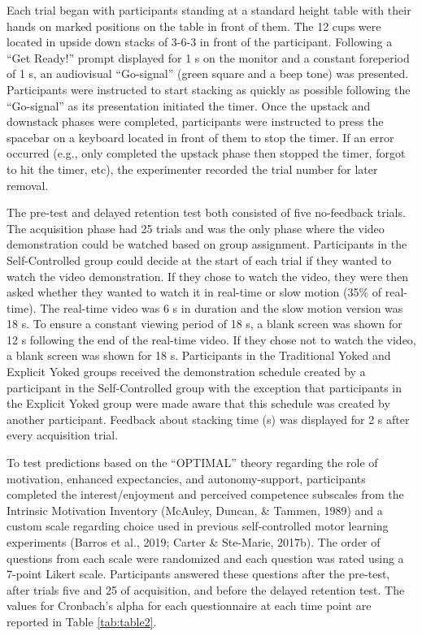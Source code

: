 \documentclass[
  english,
  doc, donotrepeattitle,floatsintext]{apa7}
\begin{document}
Each trial began with participants standing at a standard height table with their hands on marked positions on the table in front of them. The 12 cups were located in upside down stacks of 3-6-3 in front of the participant. Following a ``Get Ready!'' prompt displayed for 1 s on the monitor and a constant foreperiod of 1 s, an audiovisual ``Go-signal'' (green square and a beep tone) was presented. Participants were instructed to start stacking as quickly as possible following the ``Go-signal'' as its presentation initiated the timer. Once the upstack and downstack phases were completed, participants were instructed to press the spacebar on a keyboard located in front of them to stop the timer. If an error occurred (e.g., only completed the upstack phase then stopped the timer, forgot to hit the timer, etc), the experimenter recorded the trial number for later removal.

The pre-test and delayed retention test both consisted of five no-feedback trials. The acquisition phase had 25 trials and was the only phase where the video demonstration could be watched based on group assignment. Participants in the Self-Controlled group could decide at the start of each trial if they wanted to watch the video demonstration. If they chose to watch the video, they were then asked whether they wanted to watch it in real-time or slow motion (35\% of real-time). The real-time video was 6 s in duration and the slow motion version was 18 s. To ensure a constant viewing period of 18 s, a blank screen was shown for 12 s following the end of the real-time video. If they chose not to watch the video, a blank screen was shown for 18 s. Participants in the Traditional Yoked and Explicit Yoked groups received the demonstration schedule created by a participant in the Self-Controlled group with the exception that participants in the Explicit Yoked group were made aware that this schedule was created by another participant. Feedback about stacking time (s) was displayed for 2 s after every acquisition trial.

To test predictions based on the ``OPTIMAL'' theory regarding the role of motivation, enhanced expectancies, and autonomy-support, participants completed the interest/enjoyment and perceived competence subscales from the Intrinsic Motivation Inventory (McAuley, Duncan, \& Tammen, 1989) and a custom scale regarding choice used in previous self-controlled motor learning experiments (Barros et al., 2019; Carter \& Ste-Marie, 2017b). The order of questions from each scale were randomized and each question was rated using a 7-point Likert scale. Participants answered these questions after the pre-test, after trials five and 25 of acquisition, and before the delayed retention test. The values for Cronbach's alpha for each questionnaire at each time point are reported in Table \ref{tab:table2}.
\end{document}
